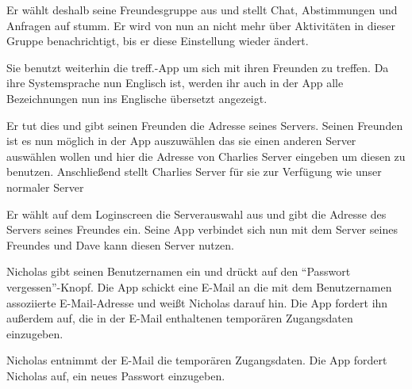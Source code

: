 \documentclass[parskip=full,11pt]{scrartcl}
\newcommand\producttitle{treff.}
\begin{document}
{Er wählt deshalb seine Freundesgruppe aus und stellt Chat, Abstimmungen und Anfragen auf stumm.}
{Er wird von nun an nicht mehr über Aktivitäten in dieser Gruppe benachrichtigt,
bis er diese Einstellung wieder ändert.}

{Sie benutzt weiterhin die \producttitle-App um sich mit ihren Freunden zu treffen.}
{Da ihre Systemsprache nun Englisch ist, werden ihr auch in der App alle Bezeichnungen
nun ins Englische übersetzt angezeigt.}

{Er tut dies und gibt seinen Freunden die Adresse seines Servers.}
{Seinen Freunden ist es nun möglich in der App auszuwählen das sie einen anderen Server auswählen wollen und hier die Adresse von
Charlies Server eingeben um diesen zu benutzen. Anschließend stellt Charlies Server für sie zur Verfügung wie unser normaler Server}


{Er wählt auf dem Loginscreen die Serverauswahl aus und gibt die Adresse des Servers seines Freundes ein.}
{Seine App verbindet sich nun mit dem Server seines Freundes und Dave kann diesen Server nutzen.}


{Nicholas gibt seinen Benutzernamen ein und drückt auf den
\enquote{Passwort vergessen}-Knopf.}
{Die App schickt eine E-Mail an die mit dem Benutzernamen assoziierte
E-Mail-Adresse und weißt Nicholas darauf hin.
Die App fordert ihn außerdem auf, die in der E-Mail enthaltenen temporären
Zugangsdaten einzugeben.}

{Nicholas entnimmt der E-Mail die temporären Zugangsdaten.}
{Die App fordert Nicholas auf, ein neues Passwort einzugeben.}
\end{document}
